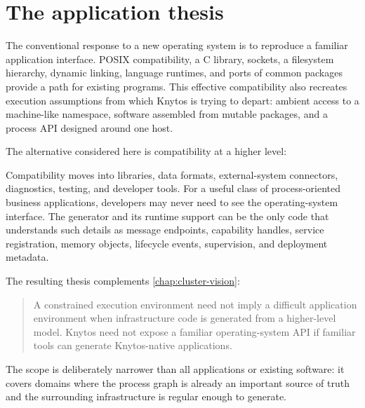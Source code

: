 \section{The application thesis}

The conventional response to a new operating system is to reproduce a familiar
application interface. POSIX compatibility, a C library, sockets, a filesystem
hierarchy, dynamic linking, language runtimes, and ports of common packages
provide a path for existing programs. This effective compatibility also
recreates execution assumptions from which Knytos is trying
to depart: ambient access to a machine-like namespace, software assembled from
mutable packages, and a process API designed around one host.

The alternative considered here is compatibility at a higher level:

\begin{center}
\end{center}

Compatibility moves into libraries, data formats, external-system connectors,
diagnostics, testing, and developer tools. For a useful class of
process-oriented business applications, developers may never need to see the
operating-system interface. The
generator and its runtime support can be the only code that understands such
details as message endpoints, capability handles, service registration, memory
objects, lifecycle events, supervision, and deployment metadata.

The resulting thesis complements \autoref{chap:cluster-vision}:

\begin{quote}
A constrained execution environment need not imply a difficult application
environment when infrastructure code is generated from a higher-level model.
Knytos need not expose a familiar operating-system API if familiar tools
can generate Knytos-native applications.
\end{quote}

The scope is deliberately narrower than all applications or existing software:
it covers domains where the process graph is already an important source of
truth and the surrounding infrastructure is regular enough to generate.

